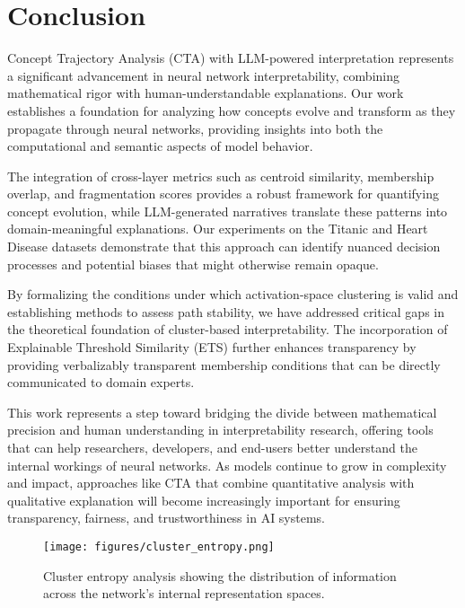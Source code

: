 \section{Conclusion}

Concept Trajectory Analysis (CTA) with LLM-powered interpretation represents a significant advancement in neural network interpretability, combining mathematical rigor with human-understandable explanations. Our work establishes a foundation for analyzing how concepts evolve and transform as they propagate through neural networks, providing insights into both the computational and semantic aspects of model behavior.

The integration of cross-layer metrics such as centroid similarity, membership overlap, and fragmentation scores provides a robust framework for quantifying concept evolution, while LLM-generated narratives translate these patterns into domain-meaningful explanations. Our experiments on the Titanic and Heart Disease datasets demonstrate that this approach can identify nuanced decision processes and potential biases that might otherwise remain opaque.

By formalizing the conditions under which activation-space clustering is valid and establishing methods to assess path stability, we have addressed critical gaps in the theoretical foundation of cluster-based interpretability. The incorporation of Explainable Threshold Similarity (ETS) further enhances transparency by providing verbalizably transparent membership conditions that can be directly communicated to domain experts.

This work represents a step toward bridging the divide between mathematical precision and human understanding in interpretability research, offering tools that can help researchers, developers, and end-users better understand the internal workings of neural networks. As models continue to grow in complexity and impact, approaches like CTA that combine quantitative analysis with qualitative explanation will become increasingly important for ensuring transparency, fairness, and trustworthiness in AI systems.

\begin{figure}[ht]
    \centering
    \texttt{[image: figures/cluster\_entropy.png]}
    \caption{Cluster entropy analysis showing the distribution of information across the network's internal representation spaces.}
    \label{fig:cluster_entropy}
\end{figure}